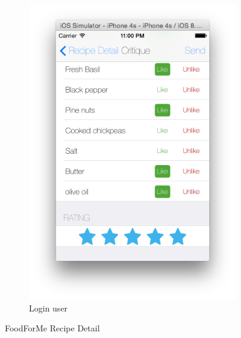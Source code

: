 \begin{figure}[h]
\begin{subfigure}{.32\textwidth}
	  		\includegraphics[width=.9\linewidth]{figures/ch4_app_screen_shots/critique/critique_4.png}
	  		\caption{Login user}
	  		\end{subfigure}
	  	\caption{FoodForMe Recipe Detail}
	  	\label{fig:foodforme_main_menu_sreen}
	  \end{figure}


